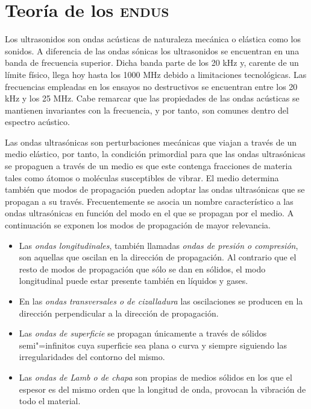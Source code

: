 \chapter{Teoría de los \textsc{endus}}

Los ultrasonidos son ondas acústicas de naturaleza mecánica o elástica como
los sonidos. A diferencia de las ondas sónicas los ultrasonidos se
encuentran en una banda de frecuencia superior. Dicha banda parte de los 20
kHz y, carente de un límite físico, llega hoy hasta los 1000 MHz debido a
limitaciones tecnológicas. Las frecuencias empleadas en los ensayos no
destructivos se encuentran entre los 20 kHz y los 25 MHz. Cabe remarcar que
las propiedades de las ondas acústicas se mantienen invariantes con la
frecuencia, y por tanto, son comunes dentro del espectro acústico.

Las ondas ultrasónicas son perturbaciones mecánicas que viajan a través de
un medio elástico, por tanto, la condición primordial para que las ondas
ultrasónicas se propaguen a través de un medio es que este contenga
fracciones de materia tales como átomos o moléculas susceptibles de vibrar.
El medio determina también que modos de propagación pueden adoptar las
ondas ultrasónicas que se propagan a su través. Frecuentemente se asocia un
nombre característico a las ondas ultrasónicas en función del modo en el
que se propagan por el medio. A continuación se exponen los modos de
propagación de mayor relevancia.

\begin{itemize}
	\item Las \emph{ondas longitudinales}, también llamadas \emph{ondas
		de presión o compresión}, son aquellas que oscilan en la
		dirección de propagación. Al contrario que el resto de
		modos de propagación que sólo se dan en sólidos, el modo
		longitudinal puede estar presente también en líquidos y
		gases.
	\item En las \emph{ondas transversales o de cizalladura} las
		oscilaciones se producen en la dirección perpendicular a la
		dirección de propagación.
	\item Las \emph{ondas de superficie} se propagan únicamente a
		través de sólidos semi"=infinitos cuya superficie sea plana
		o curva y siempre siguiendo las irregularidades del
		contorno del mismo.
	\item Las \emph{ondas de Lamb o de chapa} son propias de medios
		sólidos en los que el espesor es del mismo orden que la
		longitud de onda, provocan la vibración de todo el
		material.
\end{itemize}

